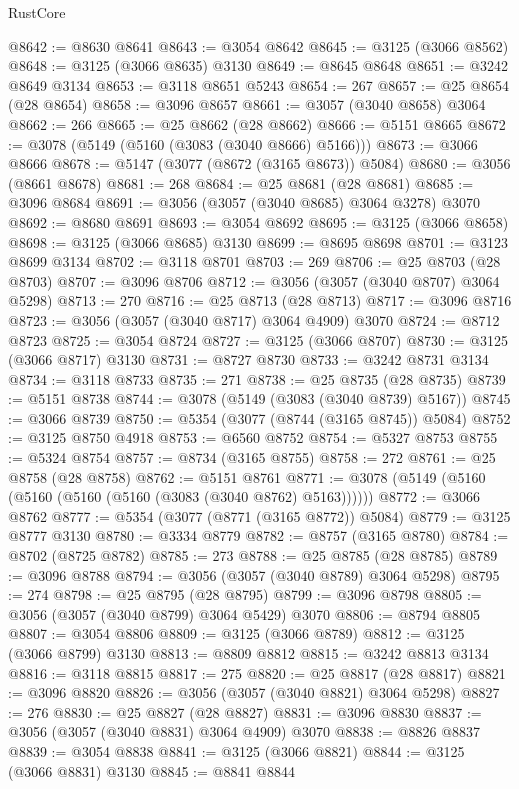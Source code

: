 \begin{lexlean}{RustCore}
\begin{coremodule}
@8642 := @8630 @8641
@8643 := @3054 @8642
@8645 := @3125 (@3066 @8562)
@8648 := @3125 (@3066 @8635) @3130
@8649 := @8645 @8648
@8651 := @3242 @8649 @3134
@8653 := @3118 @8651 @5243
@8654 := 267
@8657 := @25 @8654 (@28 @8654)
@8658 := @3096 @8657
@8661 := @3057 (@3040 @8658) @3064
@8662 := 266
@8665 := @25 @8662 (@28 @8662)
@8666 := @5151 @8665
@8672 := @3078 (@5149 (@5160 (@3083 (@3040 @8666) @5166)))
@8673 := @3066 @8666
@8678 := @5147 (@3077 (@8672 (@3165 @8673)) @5084)
@8680 := @3056 (@8661 @8678)
@8681 := 268
@8684 := @25 @8681 (@28 @8681)
@8685 := @3096 @8684
@8691 := @3056 (@3057 (@3040 @8685) @3064 @3278) @3070
@8692 := @8680 @8691
@8693 := @3054 @8692
@8695 := @3125 (@3066 @8658)
@8698 := @3125 (@3066 @8685) @3130
@8699 := @8695 @8698
@8701 := @3123 @8699 @3134
@8702 := @3118 @8701
@8703 := 269
@8706 := @25 @8703 (@28 @8703)
@8707 := @3096 @8706
@8712 := @3056 (@3057 (@3040 @8707) @3064 @5298)
@8713 := 270
@8716 := @25 @8713 (@28 @8713)
@8717 := @3096 @8716
@8723 := @3056 (@3057 (@3040 @8717) @3064 @4909) @3070
@8724 := @8712 @8723
@8725 := @3054 @8724
@8727 := @3125 (@3066 @8707)
@8730 := @3125 (@3066 @8717) @3130
@8731 := @8727 @8730
@8733 := @3242 @8731 @3134
@8734 := @3118 @8733
@8735 := 271
@8738 := @25 @8735 (@28 @8735)
@8739 := @5151 @8738
@8744 := @3078 (@5149 (@3083 (@3040 @8739) @5167))
@8745 := @3066 @8739
@8750 := @5354 (@3077 (@8744 (@3165 @8745)) @5084)
@8752 := @3125 @8750 @4918
@8753 := @6560 @8752
@8754 := @5327 @8753
@8755 := @5324 @8754
@8757 := @8734 (@3165 @8755)
@8758 := 272
@8761 := @25 @8758 (@28 @8758)
@8762 := @5151 @8761
@8771 := @3078 (@5149 (@5160 (@5160 (@5160 (@5160 (@3083 (@3040 @8762) @5163))))))
@8772 := @3066 @8762
@8777 := @5354 (@3077 (@8771 (@3165 @8772)) @5084)
@8779 := @3125 @8777 @3130
@8780 := @3334 @8779
@8782 := @8757 (@3165 @8780)
@8784 := @8702 (@8725 @8782)
@8785 := 273
@8788 := @25 @8785 (@28 @8785)
@8789 := @3096 @8788
@8794 := @3056 (@3057 (@3040 @8789) @3064 @5298)
@8795 := 274
@8798 := @25 @8795 (@28 @8795)
@8799 := @3096 @8798
@8805 := @3056 (@3057 (@3040 @8799) @3064 @5429) @3070
@8806 := @8794 @8805
@8807 := @3054 @8806
@8809 := @3125 (@3066 @8789)
@8812 := @3125 (@3066 @8799) @3130
@8813 := @8809 @8812
@8815 := @3242 @8813 @3134
@8816 := @3118 @8815
@8817 := 275
@8820 := @25 @8817 (@28 @8817)
@8821 := @3096 @8820
@8826 := @3056 (@3057 (@3040 @8821) @3064 @5298)
@8827 := 276
@8830 := @25 @8827 (@28 @8827)
@8831 := @3096 @8830
@8837 := @3056 (@3057 (@3040 @8831) @3064 @4909) @3070
@8838 := @8826 @8837
@8839 := @3054 @8838
@8841 := @3125 (@3066 @8821)
@8844 := @3125 (@3066 @8831) @3130
@8845 := @8841 @8844

\end{coremodule}
\end{lexlean}
